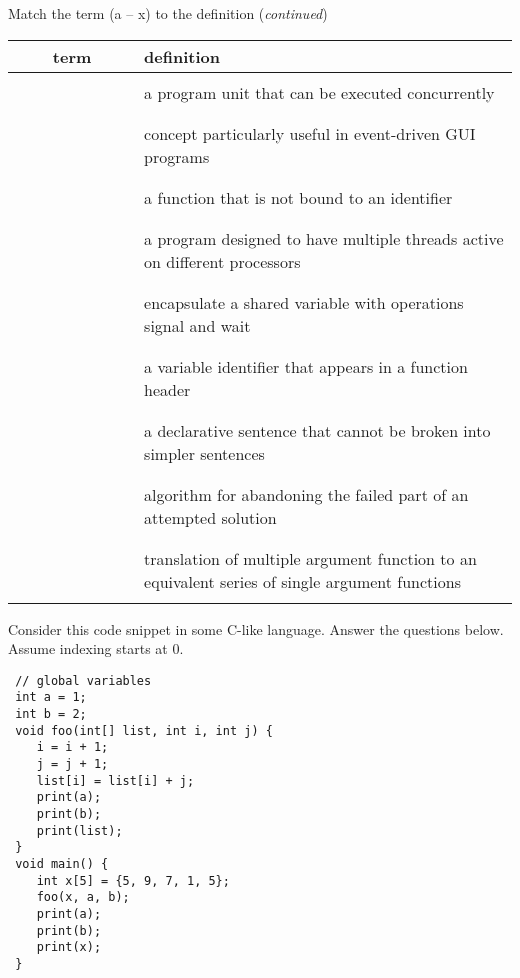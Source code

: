 \documentclass[addpoints]{exam}
\begin{document}
\begin{questions}
\newpage

Match the term (a -- x) to the definition (\textit{continued})

\begin{center}
 \begin{tabular}{|c|l|}
\hline 
~~~~term~~~~ & definition\tabularnewline
\hline 
 & \tabularnewline
 & a program unit that can be executed concurrently\tabularnewline
 & \tabularnewline
\hline 
 & \tabularnewline
 & concept particularly useful in event-driven GUI programs\tabularnewline
 & \tabularnewline
\hline 
 & \tabularnewline
 & a function that is not bound to an identifier\tabularnewline
 & \tabularnewline
\hline 
 & \tabularnewline
 & a program designed to have multiple threads active on different processors\tabularnewline
 & \tabularnewline
\hline 
 & \tabularnewline
 & encapsulate a shared variable with operations signal and wait\tabularnewline
 & \tabularnewline
\hline 
 & \tabularnewline
 & a variable identifier that appears in a function header\tabularnewline
 & \tabularnewline
\hline 
 & \tabularnewline
 & a declarative sentence that cannot be broken into simpler sentences\tabularnewline
 & \tabularnewline
\hline 
 & \tabularnewline
 & algorithm for abandoning the failed part of an attempted solution\tabularnewline
 & \tabularnewline
\hline 
 & \tabularnewline
 & translation of multiple argument function to an equivalent series
of single argument functions\tabularnewline
 & \tabularnewline
\hline 
\end{tabular}
\end{center}

\newpage

\question[10]
Consider this code snippet in some C-like language. Answer the questions below.\\
Assume indexing starts at 0.

\begin{lstlisting}
 // global variables
 int a = 1;
 int b = 2;
 void foo(int[] list, int i, int j) {
    i = i + 1;
    j = j + 1;
    list[i] = list[i] + j;
    print(a);
    print(b);
    print(list);
 }
 void main() {
    int x[5] = {5, 9, 7, 1, 5};
    foo(x, a, b);
    print(a);
    print(b);
    print(x);
 }
\end{lstlisting}

\end{questions}
\end{document}
